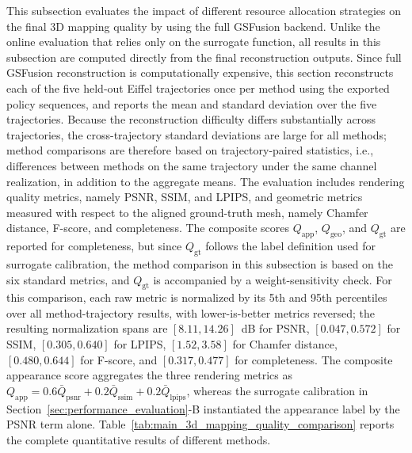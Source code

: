 \documentclass[journal]{IEEEtran}
\begin{document}
This subsection evaluates the impact of different resource allocation strategies on the final 3D mapping quality by using the full GSFusion backend. Unlike the online evaluation that relies only on the surrogate function, all results in this subsection are computed directly from the final reconstruction outputs. Since full GSFusion reconstruction is computationally expensive, this section reconstructs each of the five held-out Eiffel trajectories once per method using the exported policy sequences, and reports the mean and standard deviation over the five trajectories. Because the reconstruction difficulty differs substantially across trajectories, the cross-trajectory standard deviations are large for all methods; method comparisons are therefore based on trajectory-paired statistics, i.e., differences between methods on the same trajectory under the same channel realization, in addition to the aggregate means. The evaluation includes rendering quality metrics, namely PSNR, SSIM, and LPIPS, and geometric metrics measured with respect to the aligned ground-truth mesh, namely Chamfer distance, F-score, and completeness. The composite scores $Q_{\mathrm{app}}$, $Q_{\mathrm{geo}}$, and $Q_{\mathrm{gt}}$ are reported for completeness, but since $Q_{\mathrm{gt}}$ follows the label definition used for surrogate calibration, the method comparison in this subsection is based on the six standard metrics, and $Q_{\mathrm{gt}}$ is accompanied by a weight-sensitivity check. For this comparison, each raw metric is normalized by its 5th and 95th percentiles over all method-trajectory results, with lower-is-better metrics reversed; the resulting normalization spans are $[8.11, 14.26]$~dB for PSNR, $[0.047, 0.572]$ for SSIM, $[0.305, 0.640]$ for LPIPS, $[1.52, 3.58]$ for Chamfer distance, $[0.480, 0.644]$ for F-score, and $[0.317, 0.477]$ for completeness. The composite appearance score aggregates the three rendering metrics as $Q_{\mathrm{app}}=0.6\bar{Q}_{\mathrm{psnr}}+0.2\bar{Q}_{\mathrm{ssim}}+0.2\bar{Q}_{\mathrm{lpips}}$, whereas the surrogate calibration in Section~\ref{sec:performance_evaluation}-B instantiated the appearance label by the PSNR term alone. Table~\ref{tab:main_3d_mapping_quality_comparison} reports the complete quantitative results of different methods.
\end{document}
